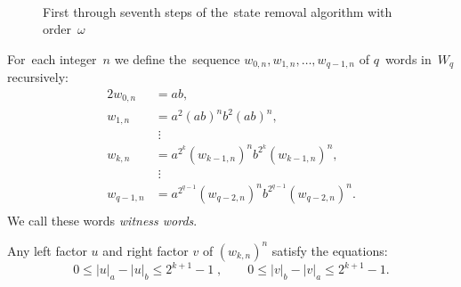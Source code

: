 \begin{figure}%
    \centering
    \hspace{-20pt}%
    \subfloat[][]{\label{fig:automaton_R8_state_removal_steps-a}%
        }%
    \hspace{70pt}%
    \subfloat[][]{\label{fig:automaton_R8_state_removal_steps-b}%
        }\\
    \subfloat[][]{\label{fig:automaton_R8_state_removal_steps-c}%
        }%
    \hspace{8pt}%
    \subfloat[][]{\label{fig:automaton_R8_state_removal_steps-d}%
        }\\
    \subfloat[][]{\label{fig:automaton_R8_state_removal_steps-e}%
        }\\
    \subfloat[][]{\label{fig:automaton_R8_state_removal_steps-e}%
        }%
    \hspace{40pt}%
    \subfloat[][]{\label{fig:automaton_R8_state_removal_steps-e}%
        }%
    \caption{First through seventh steps of the~state removal algorithm with order~$\omega$}\label{fig:automaton_R8_state_removal_steps}%
\end{figure}

\begin{defn}
    For~each integer~$n$ we define the~sequence $w_{0,n}, w_{1,n}, \dotsc , w_{q-1,n}$ of $q$~words in~$W_q$ recursively:
    \begin{alignat*}{2}
        w_{0,n} &= ab,\\
        w_{1,n} &= a^2{(ab)}^{n}b^2{(ab)}^{n},\\
                &\; \vdots \\
        w_{k,n} &= a^{2^k}{(w_{k-1,n})}^{n}b^{2^k}{(w_{k-1,n})}^{n},\\
                &\; \vdots \\
        w_{q-1,n} &= a^{2^{q-1}}{(w_{q-2,n})}^{n}b^{2^{q-1}}{(w_{q-2,n})}^{n}.\\
    \end{alignat*}
    We call these words \emph{witness words}.
\end{defn}

\begin{lemma}
    Any left factor $u$ and right factor $v$ of ${(w_{k,n})}^n$ satisfy the equations:
    \begin{equation}\label{witness_words_inequalities}
        0 \leq |u|_a - |u|_b \leq 2^{k+1}-1 \; , \qquad 0 \leq |v|_b - |v|_a \leq 2^{k+1}-1.
    \end{equation}
\end{lemma}

